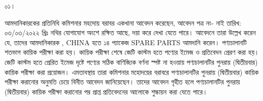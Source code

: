 \documentclass[12pt]{article}
\newcommand{\good}{SPARE PARTS}
\newcommand{\co}{CHINA}
\newcommand{\impn}{\htf}
\newcommand{\impadd}{\htfa}
\begin{document}
\noindent
\begin{minipage}[t]{0.05\linewidth}
০১।
\end{minipage}
\begin{minipage}[t]{0.95\linewidth}
আমদানিকারকের প্রতিনিধি কমিশনার মহদোয় বরাবর একখানা আবেদন করেছেন, আবেদন পত্র নং- নাই তারিখ: ০৩/০৩/২০২২ খ্রিঃ নথির যোগাযোগ অংশে রক্ষিত আছে, দয়া করে দেখা যেতে পারে। আবেদনে তারা উল্লেখ করেন যে, তাদের আমদানিকারক {\impn},
{\impadd} {\co} হতে ১৪ প্যাকেজ {\good}
আমদানি করেন।
পণ্যচালানটি শতভাগ কায়িক পরীক্ষা
করা হয়। কায়িক পরীক্ষা শেষে জেটি কাস্টম হতে
পণ্যের ইমেজ ও প্রতিবেদন প্রেরণ করা হয়। জেটি কাস্টম হতে প্রেরিত ইমেজ দৃষ্টে পণ্যের সঠিক বাণিজ্যিক বর্ণনা
স্পষ্ট না হওয়ায় পণ্যচালানটির পুনরায় (দ্বিতীয়বার) কায়িক পরীক্ষা করা প্রয়োজন। এমতাবস্থায় তারা কমিশনার মহোদয়ের বরাবরে পণ্যচালানটির পুনরায় (দ্বিতীয়বার) কায়িক পরীক্ষা করানোর অনুমতি চেয়ে বিনীত আবেদন জানিয়েছেন। তাদের আবেদন গৃহীত হলে
পণ্যচালানটির পুনরায় (দ্বিতীয়বার) কায়িক পরীক্ষা করানোর পর প্রাপ্ত প্রতিবেদনের আলোকে শুল্কায়ন করা যেতে পারে।
\end{minipage}
\end{document}
